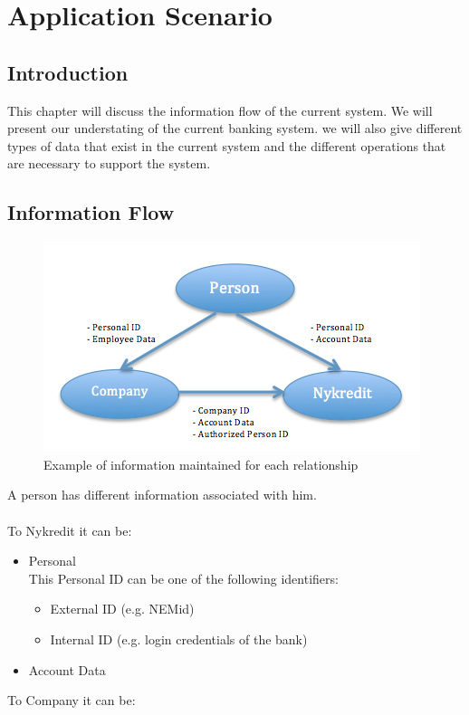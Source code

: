 \chapter{Application Scenario}
\section{Introduction}
This chapter will discuss the information flow of the current system. We will present our understating of the current banking system. we will also give different types of data that exist in the current system and the different operations that are necessary to support the system.
\section{Information Flow}
\begin{figure}[h]
	\centering
	\includegraphics[width=\textwidth]{figures/Flow}
	\caption{Example of information maintained for each relationship}
	\label{fig:Flow}
\end{figure}
A person has different information associated with him. 
\\
\\To Nykredit it can be:
\begin{itemize}
	\item Personal
	 \\This Personal ID can be one of the following identifiers:
	\begin{itemize}
		\item	External ID (e.g. NEMid)
		\item Internal ID (e.g. login credentials of the bank)
	\end{itemize}
\item Account Data
\end{itemize}
To Company it can be:
